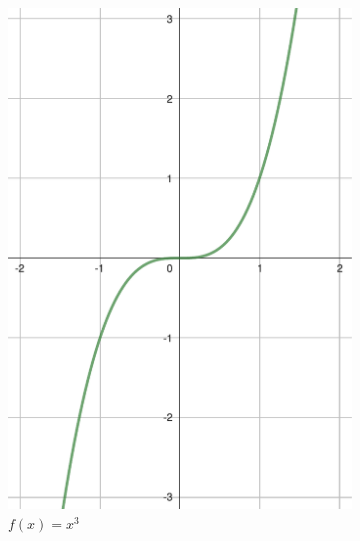 \begin{figure}[h]
    \centering
    \begin{subfigure}{0.35\textwidth}
        \includegraphics[width=\textwidth]{tex/chapter_1/assets/y=x^3.pdf}
        \caption*{$f(x) = x^3$}
    \end{subfigure}
    \hfill
    \begin{subfigure}{0.35\textwidth}

\end{subfigure}
\end{figure}
